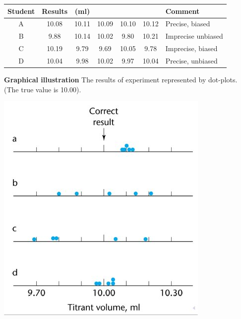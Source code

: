 \documentclass[compress]{beamer}        %
\begin{document}
\begin{frame}
\normalsize
\begin{tabular}{|c|ccccc|l|}
  \hline
Student & Results  & (ml) &  &  &  &Comment \\ \hline
A & 10.08 & 10.11 &10.09 &10.10&10.12 & Precise, biased\\ \hline
B & 9.88 &10.14& 10.02 &9.80& 10.21& Imprecise unbiased\\ \hline
C & 10.19 &9.79& 9.69 &10.05& 9.78 & Imprecise, biased\\ \hline
D & 10.04 &9.98 &10.02 &9.97 &10.04 & Precise, unbiased \\
  \hline
\end{tabular}
\bigskip
\end{frame}
\begin{frame}
\textbf{Graphical illustration}
The results of experiment represented by dot-plots. (The true value is 10.00).
\begin{center}
\includegraphics[scale=0.5]{Image10}
\end{center}
\end{frame}

\end{document}
